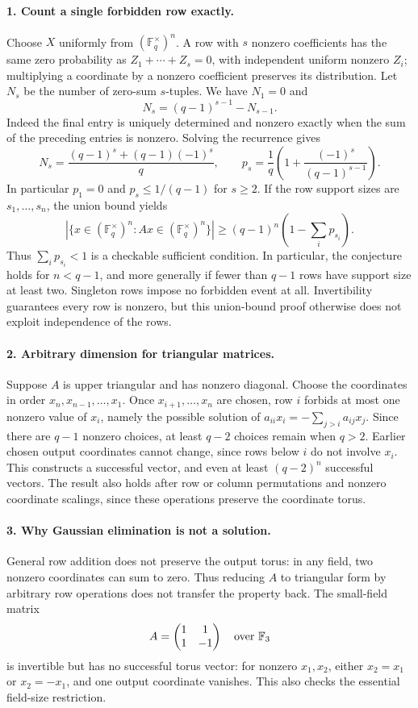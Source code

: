 \documentclass[11pt,a4paper]{article}
\begin{document}
\paragraph{1. Count a single forbidden row exactly.}
Choose $X$ uniformly from $(\mathbb F_q^\times)^n$. A row with $s$
nonzero coefficients has the same zero probability as
$Z_1+\cdots+Z_s=0$, with independent uniform nonzero $Z_i$; multiplying
a coordinate by a nonzero coefficient preserves its distribution.
Let $N_s$ be the number of zero-sum $s$-tuples. We have $N_1=0$ and
\[
 N_s=(q-1)^{s-1}-N_{s-1}.
\]
Indeed the final entry is uniquely determined and nonzero exactly when
the sum of the preceding entries is nonzero. Solving the recurrence gives
\[
 N_s=\frac{(q-1)^s+(q-1)(-1)^s}{q},\qquad
 p_s=\frac1q\left(1+\frac{(-1)^s}{(q-1)^{s-1}}\right).
\]
In particular $p_1=0$ and $p_s\le1/(q-1)$ for $s\ge2$.
If the row support sizes are $s_1,\ldots,s_n$, the union bound yields
\[
 |\{x\in(\mathbb F_q^\times)^n:Ax\in(\mathbb F_q^\times)^n\}|
 \ge(q-1)^n\left(1-\sum_i p_{s_i}\right).
\]
Thus $\sum_i p_{s_i}<1$ is a checkable sufficient condition. In particular,
the conjecture holds for $n<q-1$, and more generally if fewer than $q-1$
rows have support size at least two. Singleton rows impose no forbidden
event at all. Invertibility guarantees every row is nonzero, but this
union-bound proof otherwise does not exploit independence of the rows.

\paragraph{2. Arbitrary dimension for triangular matrices.}
Suppose $A$ is upper triangular and has nonzero diagonal. Choose the
coordinates in order $x_n,x_{n-1},\ldots,x_1$. Once $x_{i+1},\ldots,x_n$
are chosen, row $i$ forbids at most one nonzero value of $x_i$, namely
the possible solution of
$a_{ii}x_i=-\sum_{j>i}a_{ij}x_j$. Since there are $q-1$ nonzero
choices, at least $q-2$ choices remain when $q>2$.
Earlier chosen output coordinates cannot change, since rows below $i$
do not involve $x_i$. This constructs a successful vector, and even
at least $(q-2)^n$ successful vectors. The result also holds after row
or column permutations and nonzero coordinate scalings, since these
operations preserve the coordinate torus.

\paragraph{3. Why Gaussian elimination is not a solution.}
General row addition does not preserve the output torus: in any field,
two nonzero coordinates can sum to zero. Thus reducing $A$ to triangular
form by arbitrary row operations does not transfer the property back.
The small-field matrix
\[
 A=\begin{pmatrix}1&1\\1&-1\end{pmatrix}\quad\hbox{over }\mathbb F_3
\]
is invertible but has no successful torus vector: for nonzero $x_1,x_2$,
either $x_2=x_1$ or $x_2=-x_1$, and one output coordinate vanishes.
This also checks the essential field-size restriction.
\end{document}
